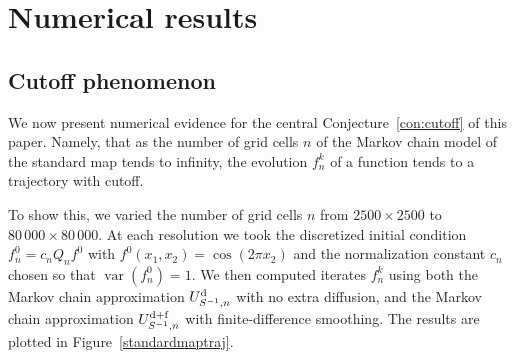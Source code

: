 \documentclass{aims}
\theoremstyle{definition}
\begin{document}
\section{Numerical results}
\label{sec:numresults}

\subsection{Cutoff phenomenon}
\label{sec:cutoff-phenomenon}

We now present numerical evidence for the central
Conjecture~\ref{con:cutoff} of this paper. Namely, that as the number
of grid cells $n$ of the Markov chain model of the standard map tends
to infinity, the evolution $f_n^k$ of a function tends to a trajectory
with cutoff.

To show this, we varied the number of grid cells $n$ from $2500 \times
2500$ to $80\,000 \times 80\,000$. At each resolution we took the
discretized initial condition $f_n^0 = c_n Q_n f^0$ with $f^0(x_1,x_2)
= \cos(2\pi x_2)$ and the normalization constant $c_n$ chosen so that
$\operatorname{var}(f_n^0) = 1$. We then computed iterates $f_n^k$
using both the Markov chain approximation $U_{S^{-1},n}^{\rm d}$ with
no extra diffusion, and the Markov chain approximation
$U_{S^{-1},n}^{\rm d+f}$ with finite-difference smoothing. The results
are plotted in Figure~\ref{standardmaptraj}.
\end{document}
